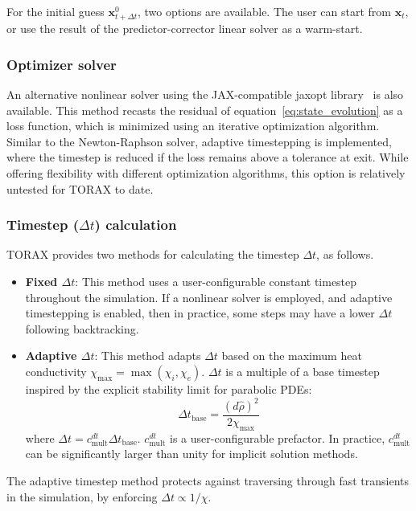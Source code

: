 \documentclass[aps, reprint, nofootinbib]{revtex4-2}
\newcommand{\rnorm}{\hat{\rho}}
\begin{document}
For the initial guess $\mathbf{x}_{t+\Delta t}^0$, two options are available. The user can start from $\mathbf{x}_t$, or use the result of the predictor-corrector linear solver as a warm-start.

\subsubsection{Optimizer solver}
An alternative nonlinear solver using the JAX-compatible jaxopt library~\cite{jaxopt:2021} is also available. This method recasts the residual of equation~\ref{eq:state_evolution} as a loss function, which is minimized using an iterative optimization algorithm. Similar to the Newton-Raphson solver, adaptive timestepping is implemented, where the timestep is reduced if the loss remains above a tolerance at exit. While offering flexibility with different optimization algorithms, this option is relatively untested for TORAX to date.

\subsubsection{Timestep ($\Delta t$) calculation}

TORAX provides two methods for calculating the timestep $\Delta t$, as follows.
\begin{itemize}
\item \textbf{Fixed $\Delta t$}: This method uses a user-configurable constant timestep throughout the simulation. If a nonlinear solver is employed, and adaptive timestepping is enabled, then in practice, some steps may have a lower $\Delta t$ following backtracking.
\item \textbf{Adaptive $\Delta t$}:  This method adapts $\Delta t$ based on the maximum heat conductivity $\chi_{\max}=\max(\chi_i, \chi_e)$.  $\Delta t$ is a multiple of a base timestep inspired by the explicit stability limit for parabolic PDEs:
\begin{equation}
\Delta t_{ \mathrm{base}}=\frac{(d\rnorm)^2}{2\chi_{\max}}
\end{equation}
where $\Delta t = c_{ \mathrm{mult}}^{dt} \Delta t_{ \mathrm{base}}$. $c_{ \mathrm{mult}}^{dt}$ is a user-configurable prefactor.  In practice, $c_{ \mathrm{mult}}^{dt}$ can be significantly larger than unity for implicit solution methods.
\end{itemize}
The adaptive timestep method protects against traversing through fast transients in the simulation, by enforcing $\Delta t \propto 1/\chi$.
\end{document}
